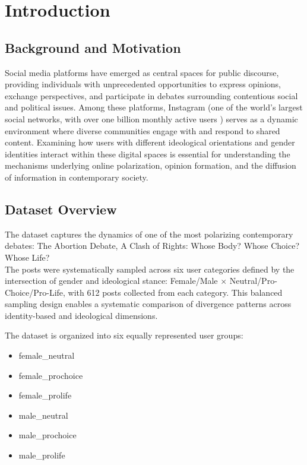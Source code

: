 \section{Introduction}

\subsection{Background and Motivation}

Social media platforms have emerged as central spaces for public discourse, providing individuals with unprecedented opportunities to express opinions, exchange perspectives, and participate in debates surrounding contentious social and political issues. Among these platforms, Instagram (one of the world’s largest social networks, with over one billion monthly active users ) serves as a dynamic environment where diverse communities engage with and respond to shared content. Examining how users with different ideological orientations and gender identities interact within these digital spaces is essential for understanding the mechanisms underlying online polarization, opinion formation, and the diffusion of information in contemporary society.

\subsection{Dataset Overview}

The dataset captures the dynamics of one of the most polarizing contemporary debates: The Abortion Debate, A Clash of Rights: Whose Body? Whose Choice? Whose Life? \\
The posts were systematically sampled across six user categories defined by the intersection of gender and ideological stance: Female/Male × Neutral/Pro-Choice/Pro-Life, with 612 posts collected from each category. This balanced sampling design enables a systematic comparison of divergence patterns across identity-based and ideological dimensions.


The dataset is organized into six equally represented user groups:
\begin{itemize}
    \item female\_neutral
    \item female\_prochoice
    \item female\_prolife
    \item male\_neutral
    \item male\_prochoice
    \item male\_prolife
\end{itemize}

